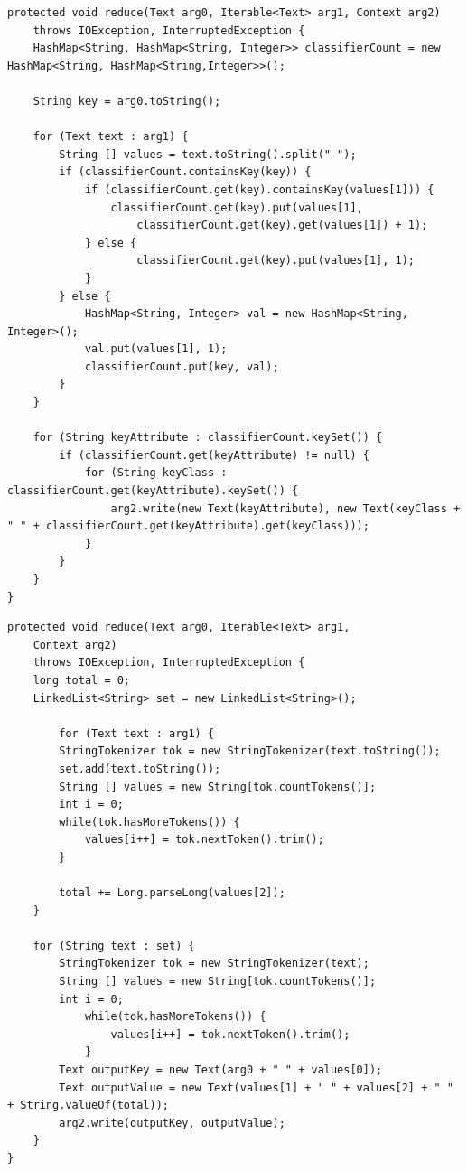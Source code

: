 \documentclass{article}
\begin{document}
\begin{lstlisting}[caption={Attrib Table Reducer code snippet},label={lst:attrtblred},style=MyJavaStyle]
protected void reduce(Text arg0, Iterable<Text> arg1, Context arg2)
    throws IOException, InterruptedException {
    HashMap<String, HashMap<String, Integer>> classifierCount = new HashMap<String, HashMap<String,Integer>>();

    String key = arg0.toString();

    for (Text text : arg1) {
        String [] values = text.toString().split(" ");
        if (classifierCount.containsKey(key)) {
            if (classifierCount.get(key).containsKey(values[1])) {
                classifierCount.get(key).put(values[1],
                    classifierCount.get(key).get(values[1]) + 1);
            } else {
                    classifierCount.get(key).put(values[1], 1);
            }
        } else {
            HashMap<String, Integer> val = new HashMap<String, Integer>();
            val.put(values[1], 1);
            classifierCount.put(key, val);
        }
    }

    for (String keyAttribute : classifierCount.keySet()) {
        if (classifierCount.get(keyAttribute) != null) {
            for (String keyClass : classifierCount.get(keyAttribute).keySet()) {
                arg2.write(new Text(keyAttribute), new Text(keyClass + " " + classifierCount.get(keyAttribute).get(keyClass)));
            }
        }
    }
}
\end{lstlisting}


\begin{lstlisting}[caption={Attrib Table Reducer 2 code snippet},label={lst:attrtblred2},style=MyJavaStyle]
protected void reduce(Text arg0, Iterable<Text> arg1,
    Context arg2)
    throws IOException, InterruptedException {
    long total = 0;
    LinkedList<String> set = new LinkedList<String>();

        for (Text text : arg1) {
        StringTokenizer tok = new StringTokenizer(text.toString());
        set.add(text.toString());
        String [] values = new String[tok.countTokens()];
        int i = 0;
        while(tok.hasMoreTokens()) {
            values[i++] = tok.nextToken().trim();
        }

        total += Long.parseLong(values[2]);
    }

    for (String text : set) {
        StringTokenizer tok = new StringTokenizer(text);
        String [] values = new String[tok.countTokens()];
        int i = 0;
            while(tok.hasMoreTokens()) {
                values[i++] = tok.nextToken().trim();
            }
        Text outputKey = new Text(arg0 + " " + values[0]);
        Text outputValue = new Text(values[1] + " " + values[2] + " " + String.valueOf(total));
        arg2.write(outputKey, outputValue);
    }
}
\end{lstlisting}
\end{document}
